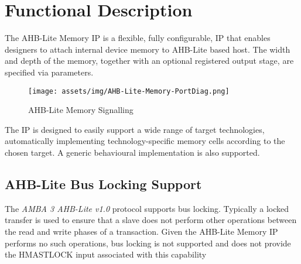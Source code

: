 \chapter{Functional Description}\label{functional-description}

The AHB-Lite Memory IP is a flexible, fully configurable, IP that enables designers to attach internal device memory to AHB-Lite based host. The width and depth of the memory, together with an optional registered output stage, are specified via parameters.

\begin{figure}[th]
	\centering
	\texttt{[image: assets/img/AHB-Lite-Memory-PortDiag.png]}
	\caption{AHB-Lite Memory Signalling}
	\label{fig:ahb-lite-memory-portdiag}
\end{figure}

The IP is designed to easily support a wide range of target
technologies, automatically implementing technology-specific memory
cells according to the chosen target. A generic behavioural
implementation is also supported.

\section{AHB-Lite Bus Locking Support} \label{ahb-lite-bus-locking-support}

The \emph{AMBA 3 AHB-Lite v1.0} protocol supports bus locking. Typically a locked transfer is used to ensure that a slave does not perform other operations between the read and write phases of a transaction. Given the AHB-Lite Memory IP performs no such operations, bus locking is not supported and does not provide the HMASTLOCK input associated with this capability